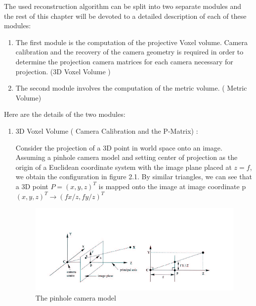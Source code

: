 The used reconstruction algorithm can be split into two separate modules and the rest of this chapter will be devoted to a detailed description of each of these modules:
\begin{enumerate}
	\item The first module is the computation of the projective Voxel volume. Camera calibration and the recovery of the camera geometry is required in order to determine the projection camera matrices for each camera necessary for projection. (3D Voxel Volume )
	\item The second module involves the computation of the metric volume.  ( Metric Volume)
\end{enumerate}
Here are the details of the two modules:
\begin{enumerate}
	\item 3D Voxel Volume ( Camera Calibration and the P-Matrix) :
	
		 Consider the projection of a 3D point in world space onto an image. Assuming a pinhole camera model and setting center of projection as the origin of a Euclidean coordinate system with the image plane placed at $z = f$, we obtain the configuration in figure 2.1. By similar triangles, we can see that a 3D point
$P = (x, y, z)^T$ is mapped onto the image at image coordinate p
$(x, y, z)^T  \rightarrow (f x/z  , f y/z )^T$
\begin{figure}[htb]
\centering
\includegraphics[scale=0.8,keepaspectratio=true]{chap2/pinhole.png}
\caption{The pinhole camera model}
\label{fig:pinhole}
\end{figure}


\end{enumerate}
